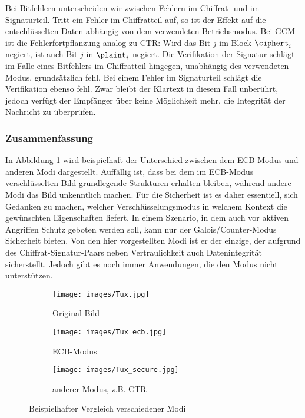 Bei Bitfehlern unterscheiden wir zwischen Fehlern im Chiffrat- und im
Signaturteil. Tritt ein Fehler im Chiffratteil auf, so ist der Effekt
auf die entschlüsselten Daten abhängig von dem verwendeten
Betriebsmodus. Bei GCM ist die Fehlerfortpflanzung analog zu CTR: Wird
das Bit $j$ im Block $\ciphert_i$ negiert, ist auch Bit $j$ in
$\plaint_i$ negiert. Die Verifikation der Signatur schlägt im Falle
eines Bitfehlers im Chiffratteil hingegen, unabhängig des verwendeten
Modus, grundsätzlich fehl. Bei einem Fehler im Signaturteil schlägt die
Verifikation ebenso fehl. Zwar bleibt der Klartext in diesem Fall
unberührt, jedoch verfügt der Empfänger über keine Möglichkeit mehr, die
Integrität der Nachricht zu überprüfen. 

\subsubsection{Zusammenfassung}
In Abbildung \ref{fig:tux_encryption_modes} wird beispielhaft der
Unterschied zwischen dem ECB-Modus und anderen Modi
dargestellt. Auffällig ist, dass bei dem im ECB-Modus verschlüsselten
Bild grundlegende Strukturen erhalten bleiben, während andere Modi das
Bild unkenntlich machen. Für die Sicherheit ist es daher essentiell,
sich Gedanken zu machen, welcher Verschlüsselungsmodus in welchem
Kontext die gewünschten Eigenschaften liefert. In einem Szenario, in dem
auch vor aktiven Angriffen Schutz geboten werden soll, kann nur der
Galois/Counter-Modus Sicherheit bieten.  Von den hier vorgestellten Modi
ist er der einzige, der aufgrund des Chiffrat-Signatur-Paars neben
Vertraulichkeit auch Datenintegrität sicherstellt. Jedoch gibt es noch
immer Anwendungen, die den Modus nicht unterstützen.
\begin{figure}[h]
  \centering
  \begin{subfigure}[b]{.3\textwidth}
    \centering
    \texttt{[image: images/Tux.jpg]}
    \caption{Original-Bild}
  \end{subfigure}
  \hfill
  \begin{subfigure}[b]{.3\textwidth}
    \centering
    \texttt{[image: images/Tux\_ecb.jpg]}
    \caption{ECB-Modus}
  \end{subfigure}
  \hfill
  \begin{subfigure}[b]{.3\textwidth}
    \centering
    \texttt{[image: images/Tux\_secure.jpg]}
    \caption{anderer Modus, z.B. CTR}
  \end{subfigure}
  \caption{Beispielhafter Vergleich verschiedener Modi}
  \label{fig:tux_encryption_modes}
\end{figure}

